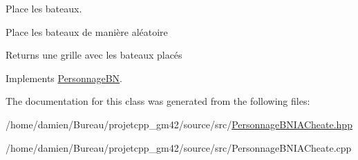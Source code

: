 Place les bateaux. 

Place les bateaux de manière aléatoire \begin{DoxyReturn}{Returns}
une grille avec les bateaux placés 
\end{DoxyReturn}


Implements \hyperlink{classPersonnageBN_a72b5b94a8e06f39c608c7310d4785579}{Personnage\-B\-N}.



The documentation for this class was generated from the following files\-:\begin{DoxyCompactItemize}
\item 
/home/damien/\-Bureau/projetcpp\-\_\-gm42/source/src/\hyperlink{PersonnageBNIACheate_8hpp}{Personnage\-B\-N\-I\-A\-Cheate.\-hpp}\item 
/home/damien/\-Bureau/projetcpp\-\_\-gm42/source/src/Personnage\-B\-N\-I\-A\-Cheate.\-cpp\end{DoxyCompactItemize}
